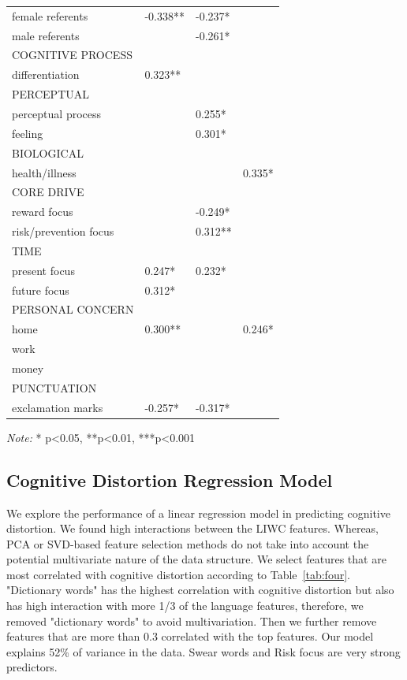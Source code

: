\begin{table}
\begin{minipage}{\columnwidth}
\begin{center}
\begin{tabular}{llll}
  female referents &-0.338** & -0.237* &     \\
  male referents &  & -0.261*  &   \\
  COGNITIVE PROCESS &  &   &   \\
  differentiation &0.323**  &   &   \\
  PERCEPTUAL &  &   &   \\
  perceptual process &  &0.255*   &   \\
  feeling &  & 0.301*  &   \\
  BIOLOGICAL &  &   &   \\
  health/illness &  &   & 0.335*  \\
  CORE DRIVE &  &   &   \\
  reward focus &  & -0.249*  &   \\
  risk/prevention focus &  & 0.312**  &   \\
  TIME &  &   &   \\
  present focus & 0.247* & 0.232*  &   \\
  future focus &0.312*  &   &   \\
  PERSONAL CONCERN &  &   &   \\
  home & 0.300** &   &   0.246*\\
  work &  &   &   \\
  money &  &   &   \\
  PUNCTUATION &  &   &   \\
  exclamation marks &-0.257*  &-0.317*   &   \\
  


  \bottomrule
\end{tabular}
\end{center}
\bigskip\centering

 \emph{Note:} * p<0.05, **p<0.01, ***p<0.001 

\end{minipage}
\end{table}%

\subsection{Cognitive Distortion Regression Model}

We explore the performance of a linear regression model in predicting cognitive distortion. We found high interactions between the LIWC features. Whereas, PCA or SVD-based feature selection methods do not take into account the potential multivariate nature of the data structure. We select features that are most correlated with cognitive distortion according to Table~\ref{tab:four}. "Dictionary words" has the highest correlation with cognitive distortion but also has high interaction with more 1/3 of the language features, therefore, we removed "dictionary words" to avoid multivariation. Then we further remove features that are more than 0.3 correlated with the top features. Our model explains 52\% of variance in the data. Swear words and Risk focus are very strong predictors.

